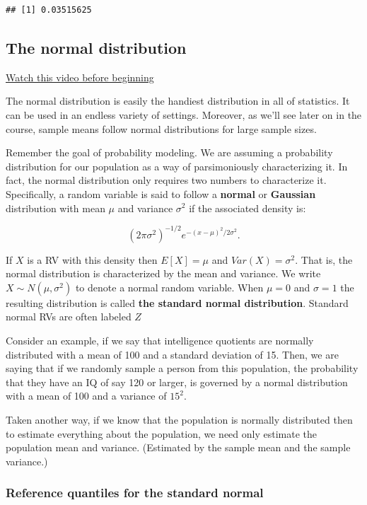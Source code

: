 \documentclass[]{article}
\begin{document}
\begin{verbatim}
## [1] 0.03515625
\end{verbatim}

\subsection{The normal distribution}\label{the-normal-distribution}

\href{http://youtu.be/dUTWvKa0Leo?list=PLpl-gQkQivXiBmGyzLrUjzsblmQsLtkzJ}{Watch
this video before beginning}

The normal distribution is easily the handiest distribution in all of
statistics. It can be used in an endless variety of settings. Moreover,
as we'll see later on in the course, sample means follow normal
distributions for large sample sizes.

Remember the goal of probability modeling. We are assuming a probability
distribution for our population as a way of parsimoniously
characterizing it. In fact, the normal distribution only requires two
numbers to characterize it. Specifically, a random variable is said to
follow a \textbf{normal} or \textbf{Gaussian} distribution with mean
$\mu$ and variance $\sigma^2$ if the associated density is:

\[
 (2\pi \sigma^2)^{-1/2}e^{-(x - \mu)^2/2\sigma^2}.
\]

If $X$ is a RV with this density then $E[X] = \mu$ and
$Var(X) = \sigma^2$. That is, the normal distribution is characterized
by the mean and variance. We write $X\sim N(\mu, \sigma^2)$ to denote a
normal random variable. When $\mu = 0$ and $\sigma = 1$ the resulting
distribution is called \textbf{the standard normal distribution}.
Standard normal RVs are often labeled $Z$

Consider an example, if we say that intelligence quotients are normally
distributed with a mean of 100 and a standard deviation of 15. Then, we
are saying that if we randomly sample a person from this population, the
probability that they have an IQ of say 120 or larger, is governed by a
normal distribution with a mean of 100 and a variance of $15^2$.

Taken another way, if we know that the population is normally
distributed then to estimate everything about the population, we need
only estimate the population mean and variance. (Estimated by the sample
mean and the sample variance.)

\subsubsection{Reference quantiles for the standard
normal}\label{reference-quantiles-for-the-standard-normal}
\end{document}
